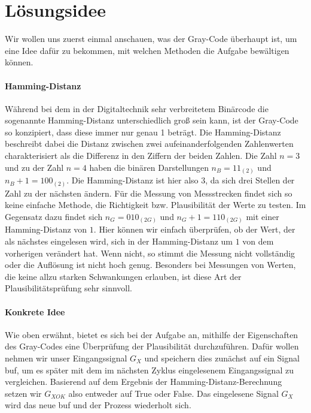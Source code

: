 \documentclass{report}
\begin{document}
\section{Lösungsidee}
\label{sec:losungsidee}
Wir wollen uns zuerst einmal anschauen, was der Gray-Code überhaupt ist, um eine Idee dafür zu bekommen, mit welchen Methoden die Aufgabe bewältigen können.


\paragraph{Hamming-Distanz}
Während bei dem in der Digitaltechnik sehr verbreitetem Binärcode die sogenannte Hamming-Distanz unterschiedlich groß sein kann, ist der Gray-Code so konzipiert, dass diese immer nur genau 1 beträgt. Die Hamming-Distanz beschreibt dabei die Distanz zwischen zwei aufeinanderfolgenden Zahlenwerten charakterisiert als die Differenz in den Ziffern der beiden Zahlen. Die Zahl $n = 3$ und zu der Zahl $n = 4$ haben die binären Darstellungen $n_{B} = 11_{(2)}$ und $n_{B}+1 = 100_{(2)}$. Die Hamming-Distanz ist hier also $3$, da sich drei Stellen der Zahl zu der nächsten ändern. Für die Messung von Messstrecken findet sich so keine einfache Methode, die Richtigkeit bzw. Plausibilität der Werte zu testen. Im Gegensatz dazu findet sich $n_{G} = 010_{(2G)}$ und $n_{G}+1 = 110_{(2G)}$ mit einer Hamming-Distanz von $1$. Hier können wir einfach überprüfen, ob der Wert, der als nächstes eingelesen wird, sich in der Hamming-Distanz um $1$ von dem vorherigen verändert hat. Wenn nicht, so stimmt die Messung nicht vollständig oder die Auflösung ist nicht hoch genug. Besonders bei Messungen von Werten, die keine allzu starken Schwankungen erlauben, ist diese Art der Plausibilitätsprüfung sehr sinnvoll.

\paragraph{Konkrete Idee}
Wie oben erwähnt, bietet es sich bei der Aufgabe an, mithilfe der Eigenschaften des Gray-Codes eine Überprüfung der Plausibilität durchzuführen. Dafür wollen nehmen wir unser Eingangssignal $G_{X}$ und speichern dies zunächst auf ein Signal buf, um es später mit dem im nächsten Zyklus eingelesenem Eingangssignal zu vergleichen. Basierend auf dem Ergebnis der Hamming-Distanz-Berechnung setzen wir $G_{XOK}$ also entweder auf True oder False. Das eingelesene Signal $G_{X}$ wird das neue buf und der Prozess wiederholt sich.

\newpage
\end{document}
